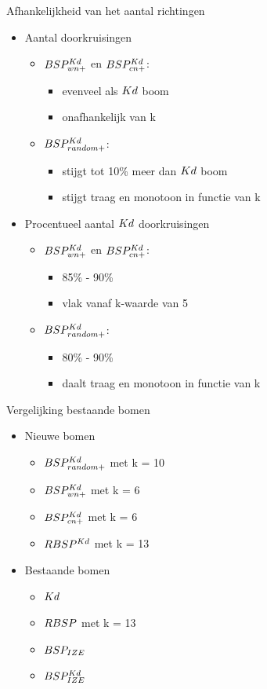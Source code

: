 \documentclass[11pt,t]{beamer}
\begin{document}
\begin{frame}{Afhankelijkheid van het aantal richtingen}
	\begin{itemize}
		\item Aantal doorkruisingen
		\begin{itemize}
			\item $BSP^{Kd}_{wn+}$ en $BSP^{Kd}_{cn+}$:
				\begin{itemize}
					\item evenveel als $Kd$ boom
					\item onafhankelijk van k
				\end{itemize}
			\item $BSP^{Kd}_{random+}$:
				\begin{itemize}
					\item stijgt tot 10\% meer dan $Kd$ boom
					\item stijgt traag en monotoon in functie van k
				\end{itemize}
		\end{itemize}
		\item Procentueel aantal $Kd$ doorkruisingen
		\begin{itemize}
			\item $BSP^{Kd}_{wn+}$ en $BSP^{Kd}_{cn+}$:
				\begin{itemize}
					\item 85\% - 90\%
					\item vlak vanaf k-waarde van 5
				\end{itemize}
			\item $BSP^{Kd}_{random+}$:
				\begin{itemize}
					\item 80\% - 90\%
					\item daalt traag en monotoon in functie van k
				\end{itemize}
		\end{itemize}
	\end{itemize}
\end{frame}

\begin{frame}{Vergelijking bestaande bomen}
	\begin{itemize}
		\item Nieuwe bomen
		\begin{itemize}
			\item $BSP^{Kd}_{random+}$ met k = 10
			\item $BSP^{Kd}_{wn+}$ met k = 6
			\item $BSP^{Kd}_{cn+}$ met k = 6
			\item $RBSP^{Kd}$ met k = 13
		\end{itemize}
		\item Bestaande bomen
		\begin{itemize}
			\item $Kd$
			\item $RBSP$ met k = 13
			\item $BSP_{IZE}$
			\item $BSP^{Kd}_{IZE}$
		\end{itemize}
	\end{itemize}
\end{frame}
\end{document}
